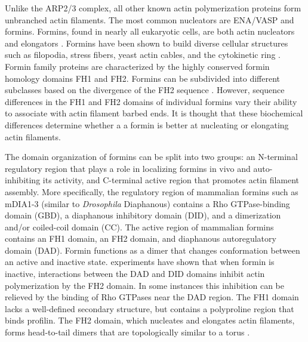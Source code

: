 \documentclass{ucetd}
\begin{document}
Unlike the ARP2/3 complex, all other known actin polymerization proteins form unbranched actin filaments.  The most common nucleators are ENA/VASP and formins.  Formins, found in nearly all eukaryotic cells, are both actin nucleators and elongators \cite{Chesarone:2010iw}.  Formins have been shown to build diverse cellular structures such as filopodia, stress fibers, yeast actin cables, and the cytokinetic ring \cite{Suarez:2016bw}.  Formin family proteins are characterized by the highly conserved formin homology domains FH1 and FH2.  Formins can be subdivided into different subclasses based on the divergence of the FH2 sequence \cite{Higgs:2005hn}.  However, sequence differences in the FH1 and FH2 domains of individual formins vary their ability to associate with actin filament barbed ends.  It is thought that these biochemical differences determine whether a a formin is better at nucleating or elongating actin filaments.

The domain organization of formins can be split into two groups: an N-terminal regulatory region that plays a role in localizing formins in vivo and auto-inhibiting its activity, and C-terminal active region that promotes actin filament assembly.  More specifically, the regulatory region of mammalian formins such as mDIA1-3 (similar to \textit{Drosophila} Diaphanous) contains a Rho GTPase-binding domain (GBD), a diaphanous inhibitory domain (DID), and a dimerization and/or coiled-coil domain (CC).  The active region of mammalian formins contains an FH1 domain, an FH2 domain, and diaphanous autoregulatory domain (DAD).  Formin functions as a dimer that changes conformation between an active and inactive state.   experiments have shown that when formin is inactive, interactions between the DAD and DID domains inhibit actin polymerization by the FH2 domain.  In some instances this inhibition can be relieved by the binding of Rho GTPases near the DAD region.  The FH1 domain lacks a well-defined secondary structure, but contains a polyproline region that binds profilin.  The FH2 domain, which nucleates and elongates actin filaments, forms head-to-tail dimers that are topologically similar to a torus \cite{Xu:2004vc}.
\end{document}
